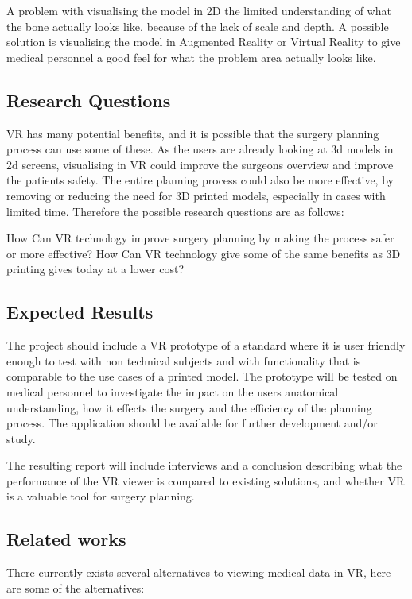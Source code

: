 \documentclass[12pt]{scrartcl}
\begin{document}
A problem with visualising the model in 2D the limited understanding of what
the bone actually looks like, because of the lack of scale and depth. A
possible solution is visualising the model in Augmented Reality or Virtual
Reality to give medical personnel a good feel for what the problem area actually looks like.

\subsection{Research Questions}
VR has many potential benefits, and it is possible that the surgery planning
process can use some of these. As the users are already looking at 3d models in
2d screens, visualising in VR could improve the surgeons overview and improve the patients safety. The entire planning process could also be more effective, by removing or reducing the need for 3D printed models, especially in cases with limited time. Therefore the possible research questions are as follows:

How Can VR technology improve surgery planning by making the process safer or more effective?
How Can VR technology give some of the same benefits as 3D printing gives today at a lower cost?


\subsection{Expected Results}
The project should include a VR prototype of a standard where it is
user friendly enough to test with non technical subjects and with functionality
that is comparable to the use cases of a printed model.
The prototype will be tested on medical personnel to investigate the impact on the users anatomical understanding, how it effects the surgery and the efficiency of the planning process. 
The application should be available for further development and/or study.

The resulting report will include interviews and a conclusion describing what the
performance of the VR viewer is compared to existing solutions, and whether VR is a
valuable tool for surgery planning.  

\subsection{Related works}

There currently exists several alternatives to viewing medical data in VR, here are some of the alternatives:
\end{document}

